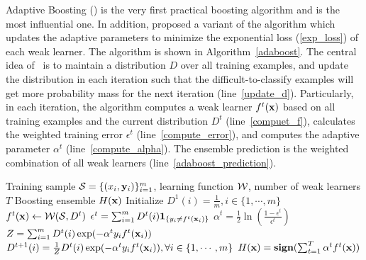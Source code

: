 {Adaptive Boosting (\adaboost) \citet{Freund97a} is the very first practical boosting algorithm and is the most influential one.
In addition, \citet{Schapire99improved} proposed a variant of the algorithm which updates the adaptive parameters to minimize the exponential loss (\ref{exp_loss}) of each weak learner.
The algorithm is shown in Algorithm~\ref{adaboost}.
The central idea of \adaboost\ is to maintain a distribution $D$ over all training examples, and update the distribution in each iteration such that the difficult-to-classify examples will get more probability mass for the next iteration (line~\ref{update_d}).
Particularly, in each iteration, the algorithm computes a weak learner $f^t(\mathbf {x})$ based on all training examples and the current distribution $D^{t}$ (line~\ref{compuet_f}), calculates the weighted training error $\epsilon^t$ (line~\ref{compute_error}), and computes the adaptive parameter $\alpha^t$ (line~\ref{compute_alpha}).
The ensemble prediction is the weighted combination of all weak learners (line~\ref{adaboost_prediction}).

\begin{algorithm}
\caption{\adaboost}
\label{adaboost}
\begin{algorithmic}[1]
	\REQUIRE Training sample $\mathcal{S} = \{(x_i,\mathbf {y}_i)\}_{i=1}^m$, learning function $\mathcal{W}$, number of weak learners $T$
	\ENSURE Boosting ensemble $H(\mathbf {x})$
	\STATE Initialize $D^1(i)=\frac{1}{m},i\in\{1,\cdots,m\}$
		\STATE $f^t(\mathbf {x})\leftarrow\mathcal{W}(\mathcal{S},D^{t})$ \label{compuet_f}
		\STATE $\epsilon^t = \sum_{i=1}^{m}D^t(i)\mathbf{1}_{\{y_i\neq f^t(\mathbf {x}_i)\}}$ \label{compute_error}
		\STATE $\alpha^{t} = \frac{1}{2}\ln\left(\frac{1-\epsilon^t}{\epsilon^t}\right)$ \label{compute_alpha}
		\STATE $Z=\sum_{i=1}^{m}D^{t}(i)\exp(-\alpha^ty_if^t(\mathbf {x}_i))$
		\STATE $D^{t+1}(i) = \frac{1}{Z}D^{t}(i)\exp(-\alpha^ty_if^t(\mathbf {x}_i)),\forall i\in\{1,\cdots,m\}$ \label{update_d}
	\ENDFOR
	\RETURN $H(\mathbf {x}) = \textbf{sign}(\sum_{t=1}^T\alpha^tf^t(\mathbf {x}))$ \label{adaboost_prediction}
\end{algorithmic}
\end{algorithm}

}
